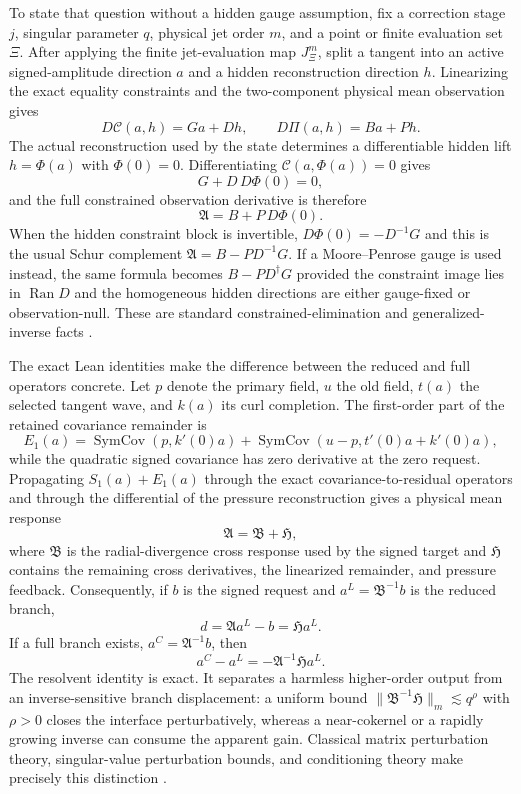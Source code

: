 \documentclass[12pt]{article}
\theoremstyle{plain}
\theoremstyle{definition}
\theoremstyle{remark}
\newcommand{\Ran}{\operatorname{Ran}}
\newcommand{\SymCov}{\operatorname{SymCov}}
\newcommand{\Comp}{\mathfrak A}
\newcommand{\Red}{\mathfrak B}
\newcommand{\Hidden}{\mathfrak H}
\newcommand{\Constr}{\mathcal C}
\newcommand{\Obs}{\Pi}
\begin{document}
To state that question without a hidden gauge assumption, fix a correction stage \(j\), singular parameter \(q\), physical jet order \(m\), and a point or finite evaluation set \(\Xi\). After applying the finite jet-evaluation map \(J^m_{\Xi}\), split a tangent into an active signed-amplitude direction \(a\) and a hidden reconstruction direction \(h\). Linearizing the exact equality constraints and the two-component physical mean observation gives
\[
D\Constr(a,h)=Ga+Dh,
\qquad
D\Obs(a,h)=Ba+Ph.
\]
The actual reconstruction used by the state determines a differentiable hidden lift \(h=\Phi(a)\) with \(\Phi(0)=0\). Differentiating \(\Constr(a,\Phi(a))=0\) gives
\[
G+D\,D\Phi(0)=0,
\]
and the full constrained observation derivative is therefore
\[
\boxed{\Comp=B+P\,D\Phi(0).}
\]
When the hidden constraint block is invertible, \(D\Phi(0)=-D^{-1}G\) and this is the usual Schur complement \(\Comp=B-PD^{-1}G\). If a Moore--Penrose gauge is used instead, the same formula becomes \(B-PD^{\dagger}G\) provided the constraint image lies in \(\Ran D\) and the homogeneous hidden directions are either gauge-fixed or observation-null. These are standard constrained-elimination and generalized-inverse facts \cite{BenIsraelGreville2003,Zhang2005,Lee2012}.

The exact Lean identities make the difference between the reduced and full operators concrete. Let \(p\) denote the primary field, \(u\) the old field, \(t(a)\) the selected tangent wave, and \(k(a)\) its curl completion. The first-order part of the retained covariance remainder is
\[
E_1(a)=\SymCov(p,k'(0)a)
+\SymCov(u-p,t'(0)a+k'(0)a),
\]
while the quadratic signed covariance has zero derivative at the zero request. Propagating \(S_1(a)+E_1(a)\) through the exact covariance-to-residual operators and through the differential of the pressure reconstruction gives a physical mean response
\[
\boxed{\Comp=\Red+\Hidden,}
\]
where \(\Red\) is the radial-divergence cross response used by the signed target and \(\Hidden\) contains the remaining cross derivatives, the linearized remainder, and pressure feedback. Consequently, if \(b\) is the signed request and \(a^L=\Red^{-1}b\) is the reduced branch,
\[
\boxed{d=\Comp a^L-b=\Hidden a^L.}
\]
If a full branch exists, \(a^C=\Comp^{-1}b\), then
\[
\boxed{a^C-a^L=-\Comp^{-1}\Hidden a^L.}
\]
The resolvent identity is exact. It separates a harmless higher-order output from an inverse-sensitive branch displacement: a uniform bound \(\|\Red^{-1}\Hidden\|_m\lesssim q^\rho\) with \(\rho>0\) closes the interface perturbatively, whereas a near-cokernel or a rapidly growing inverse can consume the apparent gain. Classical matrix perturbation theory, singular-value perturbation bounds, and conditioning theory make precisely this distinction \cite{StewartSun1990,Wedin1972,TrefethenBau1997,GolubVanLoan2013}.
\end{document}

